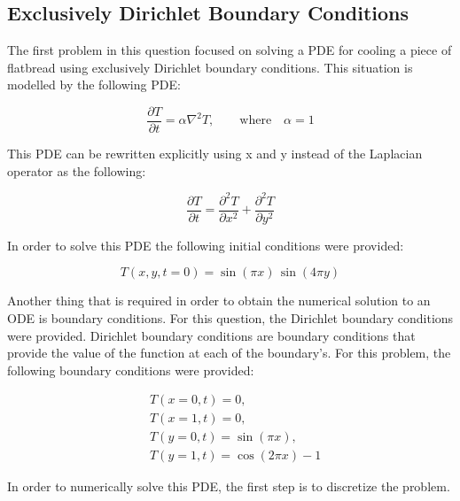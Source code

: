 \documentclass[12pt]{article}
\begin{document}
\subsection{Exclusively Dirichlet Boundary Conditions}

The first problem in this question focused on solving a PDE for cooling a piece of flatbread using exclusively Dirichlet boundary conditions. This situation is modelled by the following PDE:

\begin{equation}
    \label{eqn:q3_PDE}
    \frac{\partial T}{\partial t} = \alpha \nabla^2 T , \qquad \text{where} \quad \alpha = 1
\end{equation}

\noindent This PDE can be rewritten explicitly using x and y instead of the Laplacian operator as the following:

\begin{equation}
    \label{eqn:q3_PDE_simplified}
    \frac{\partial T}{\partial t} = \frac{\partial^2 T}{\partial x^2} + \frac{\partial^2 T}{\partial y^2}
\end{equation}

\noindent In order to solve this PDE the following initial conditions were provided: 

\begin{equation}
        \label{eqn:q3_Dirichlet_IC}
        T(x,y,t=0) = \sin(\pi x) \, \sin(4\pi y)
\end{equation}

Another thing that is required in order to obtain the numerical solution to an ODE is boundary conditions. For this question, the Dirichlet boundary conditions were provided. Dirichlet boundary conditions are boundary conditions that provide the value of the function at each of the boundary's. For this problem, the following boundary conditions were provided:

\begin{equation}
    \label{eqn:q3_Dirichlet_BC}
    \begin{aligned}
        & T(x = 0, t) = 0, \\
        & T(x = 1, t) = 0, \\
        & T(y = 0, t) = \sin(\pi x), \\
        & T(y = 1, t) = \cos(2\pi x) - 1
    \end{aligned}
\end{equation}

\noindent In order to numerically solve this PDE, the first step is to discretize the problem.
\end{document}
